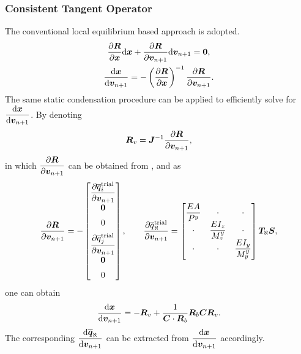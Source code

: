 \subsubsection{Consistent Tangent Operator}
The conventional local equilibrium based approach is adopted.
\begin{gather}
\dfrac{\partial{\bm{R}}}{\partial{\bm{x}}}\mathrm{d}\bm{x}+\dfrac{\partial{\bm{R}}}{\partial{\bm{v}_{n+1}}}\mathrm{d}\bm{v}_{n+1}=\bm{0},\\
\dfrac{\mathrm{d}\bm{x}}{\mathrm{d}\bm{v}_{n+1}}=-\left(\dfrac{\partial{\bm{R}}}{\partial{\bm{x}}}\right)^{-1}\dfrac{\partial{\bm{R}}}{\partial{\bm{v}_{n+1}}}.
\end{gather}
The same static condensation procedure can be applied to efficiently solve for $\dfrac{\mathrm{d}\bm{x}}{\mathrm{d}\bm{v}_{n+1}}$. By denoting
\begin{gather}
\bm{R}_v=\bm{J}^{-1}\dfrac{\partial{\bm{R}}}{\partial{\bm{v}_{n+1}}},
\end{gather}
in which $\dfrac{\partial{\bm{R}}}{\partial{\bm{v}_{n+1}}}$ can be obtained from ,  and  as
\begin{gather}
\dfrac{\partial{\bm{R}}}{\partial{\bm{v}_{n+1}}}=-\begin{bmatrix}
\dfrac{\partial{\overline{q}_i^\text{trial}}}{\partial{\bm{v}_{n+1}}}\\[2mm]
\bm{0}\\[2mm]
0\\[2mm]
\dfrac{\partial{\overline{q}_j^\text{trial}}}{\partial{\bm{v}_{n+1}}}\\[2mm]
\bm{0}\\[2mm]
0
\end{bmatrix},\qquad
\dfrac{\partial{\overline{q}_\aleph^\text{trial}}}{\partial{\bm{v}_{n+1}}}=\begin{bmatrix}
\dfrac{EA}{P^y}&\cdot&\cdot\\
\cdot&\dfrac{EI_z}{M_z^y}&\cdot\\
\cdot&\cdot&\dfrac{EI_y}{M_y^y}\\
\end{bmatrix}\bm{T}_\aleph\bm{S},
\end{gather}
one can obtain
\begin{gather}
\dfrac{\mathrm{d}\bm{x}}{\mathrm{d}\bm{v}_{n+1}}=-\bm{R}_v+\dfrac{1}{\bm{C}\cdot\bm{R}_b}\bm{R}_b\bm{C}\bm{R}_v.
\end{gather}
The corresponding $\dfrac{\mathrm{d}\bm{\overline{q}}_\aleph}{\mathrm{d}\bm{v}_{n+1}}$ can be extracted from $\dfrac{\mathrm{d}\bm{x}}{\mathrm{d}\bm{v}_{n+1}}$ accordingly.

